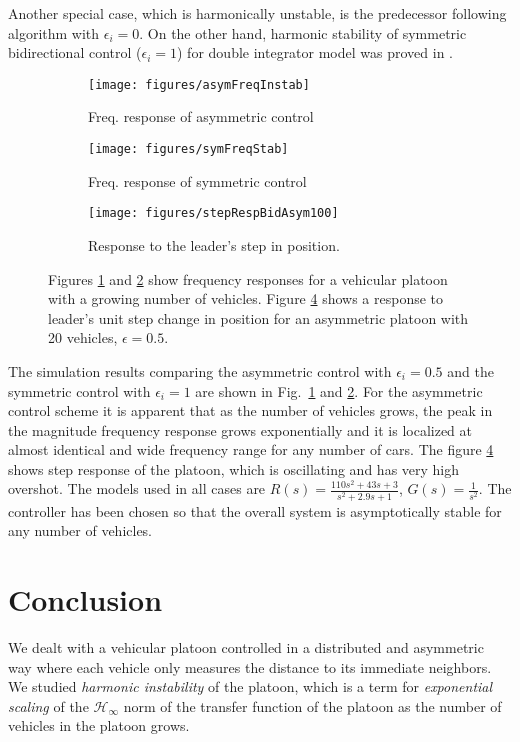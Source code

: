 \documentclass[technote, 10pt, twoside]{IEEEtran}
\newcommand{\lapDom}{s}
\newcommand{\vehicleTf}{G}
\newcommand{\controllerTf}{R}
\theoremstyle{plain}
\theoremstyle{definition}
\theoremstyle{assump}
\begin{document}
Another special case, which is harmonically unstable, is the predecessor following algorithm with $\epsilon_i=0$. On the other hand, harmonic stability
of symmetric bidirectional control ($\epsilon_i=1$) for double integrator model was proved in \cite{Veerman2007}. 
 \begin{figure}[t] 
\centering
	\begin{subfigure}[b]{0.35\textwidth}
	\texttt{[image: figures/asymFreqInstab]}
	\caption{Freq. response of asymmetric control}
	\label{fig:stringInstab}
	\end{subfigure}   
	\begin{subfigure}[b]{0.35\textwidth} 
	\texttt{[image: figures/symFreqStab]}	
	\caption{Freq. response of symmetric control}\label{fig:stringStab}  
	\end{subfigure} 
	\begin{subfigure}[b]{0.35\textwidth}
	\texttt{[image: figures/stepRespBidAsym100]}	
	\caption{Response to the leader's step in position.}\label{fig:stepResp}
	\end{subfigure}
	\caption{Figures \ref{fig:stringInstab} and \ref{fig:stringStab} show frequency
	responses for a vehicular platoon with a growing number of vehicles. Figure \ref{fig:stepResp} shows a response to leader's unit step change
	in position for an asymmetric platoon with 20 vehicles, $\epsilon=0.5$.}
	\vspace{-10pt}
\end{figure} 

The simulation results comparing the asymmetric control with $\epsilon_i=0.5$ and the symmetric control with $\epsilon_i=1$ are shown in Fig.~\ref{fig:stringInstab} and \ref{fig:stringStab}. For the asymmetric control scheme it is apparent that as the number of vehicles grows, the peak in the magnitude frequency response
grows exponentially and it is localized at almost identical and wide frequency
range for any number of cars. The figure \ref{fig:stepResp} shows step
response of the platoon, which is oscillating and has very high overshot. The
models used in all cases are $\controllerTf(\lapDom)=\frac{110 s^2 + 43s + 3}{s^2 + 2.9s+ 1}$, $\vehicleTf(\lapDom)=\frac{1}{s^2}$. The controller has been chosen so that the overall system is asymptotically stable for any number of vehicles.
  
\section{Conclusion}
We dealt with a vehicular platoon controlled in a distributed and asymmetric way
where each vehicle only measures the distance to its immediate neighbors. 
We studied \textit{harmonic instability} of
the platoon, which is a term 
for \textit{exponential scaling}
of the $\mathcal{H}_\infty$ norm of the transfer function of the platoon as the
number of vehicles in the platoon grows. 
\end{document}
